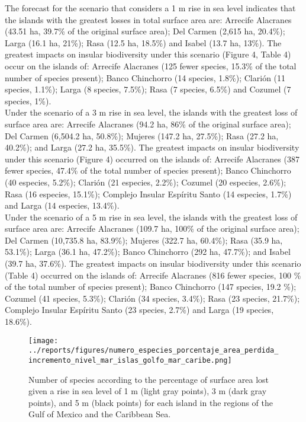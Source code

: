 \documentclass{article} %
\begin{document}
The forecast for the scenario that considers a 1 m rise in sea level indicates that the
islands with the greatest losses in total surface area are: Arrecife Alacranes (43.51 ha, 39.7\% of the original surface area); Del Carmen (2,615 ha, 20.4\%); Larga (16.1 ha, 21\%); Rasa (12.5 ha, 18.5\%) and Isabel (13.7 ha, 13\%). The greatest impacts
on insular biodiversity under this scenario (Figure 4, Table 4) occur on the islands of:
Arrecife Alacranes (125 fewer species, 15.3\% of the total number of species present);
Banco Chinchorro (14 species, 1.8\%); Clarión (11 species, 1.1\%); Larga (8 species,
7.5\%); Rasa (7 species, 6.5\%) and Cozumel (7 species, 1\%).\\

Under the scenario of a 3 m rise in sea level, the islands with the greatest loss of
surface area are: Arrecife Alacranes (94.2 ha, 86\% of the original surface area); Del
Carmen (6,504.2 ha, 50.8\%); Mujeres (147.2 ha, 27.5\%); Rasa (27.2 ha, 40.2\%);
and Larga (27.2 ha, 35.5\%). The greatest impacts on insular biodiversity under this
scenario (Figure 4) occurred on the islands of: Arrecife Alacranes (387 fewer species,
47.4\% of the total number of species present); Banco Chinchorro (40 especies,
5.2\%); Clarión (21 especies, 2.2\%); Cozumel (20 especies, 2.6\%); Rasa (16
especies, 15.1\%); Complejo Insular Espíritu Santo (14 especies, 1.7\%) and Larga
(14 especies, 13.4\%).\\

Under the scenario of a 5 m rise in sea level, the islands with the greatest loss of
surface area are: Arrecife Alacranes (109.7 ha, 100\% of the original surface area);
Del Carmen (10,735.8 ha, 83.9\%); Mujeres (322.7 ha, 60.4\%); Rasa (35.9 ha,
53.1\%); Larga (36.1 ha, 47.2\%); Banco Chinchorro (292 ha, 47.7\%); and Isabel
(39.7 ha, 37.6\%). The greatest impacts on insular biodiversity under this scenario
(Table 4) occurred on the islands of: Arrecife Alacranes (816 fewer species, 100 \% of
the total number of species present); Banco Chinchorro (147 species, 19.2 \%);
Cozumel (41 species, 5.3\%); Clarión (34 species, 3.4\%); Rasa (23 species, 21.7\%); Complejo Insular Espíritu Santo (23 species, 2.7\%) and Larga (19 species, 18.6\%).\\


\begin{figure}
  \begin{center}
  \texttt{[image: ../reports/figures/numero\_especies\_porcentaje\_area\_perdida\_incremento\_nivel\_mar\_islas\_golfo\_mar\_caribe.png]}
  \caption{Number of species according to the percentage of surface area lost given a rise in sea level of 1 m (light gray points), 3 m (dark gray points), and 5 m (black points) for each island in the regions of the Gulf of Mexico and the Caribbean Sea.}
  \label{fig:number_species}
  \end{center}
\end{figure}
\end{document}
